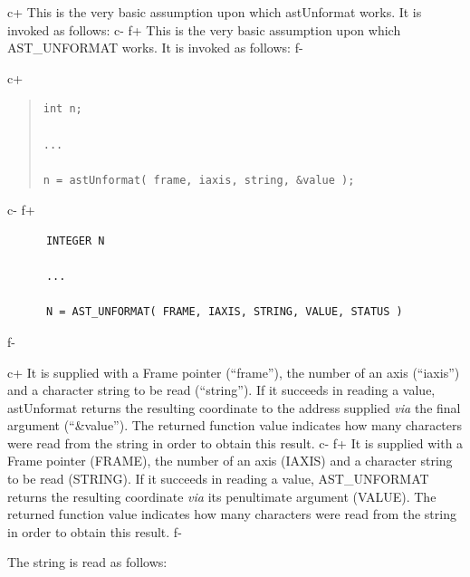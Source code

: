 \documentclass[twoside,11pt]{article}
\begin{document}
c+
This is the very basic assumption upon which astUnformat works. It is
invoked as follows:
c-
f+
This is the very basic assumption upon which AST\_UNFORMAT works. It is
invoked as follows:
f-

c+
\begin{quote}
\small
\begin{verbatim}
int n;

...

n = astUnformat( frame, iaxis, string, &value );
\end{verbatim}
\normalsize
\end{quote}
c-
f+
\small
\begin{verbatim}
      INTEGER N

      ...

      N = AST_UNFORMAT( FRAME, IAXIS, STRING, VALUE, STATUS )
\end{verbatim}
\normalsize
f-

c+
It is supplied with a Frame pointer (``frame''), the number of an axis
(``iaxis'') and a character string to be read (``string''). If it
succeeds in reading a value, astUnformat returns the resulting
coordinate to the address supplied {\em{via}} the final argument
(``\&value''). The returned function value indicates how many
characters were read from the string in order to obtain this result.
c-
f+
It is supplied with a Frame pointer (FRAME), the number of an axis
(IAXIS) and a character string to be read (STRING). If it succeeds in
reading a value, AST\_UNFORMAT returns the resulting coordinate
{\em{via}} its penultimate argument (VALUE). The returned function
value indicates how many characters were read from the string in order
to obtain this result.
f-

The string is read as follows:
\end{document}
